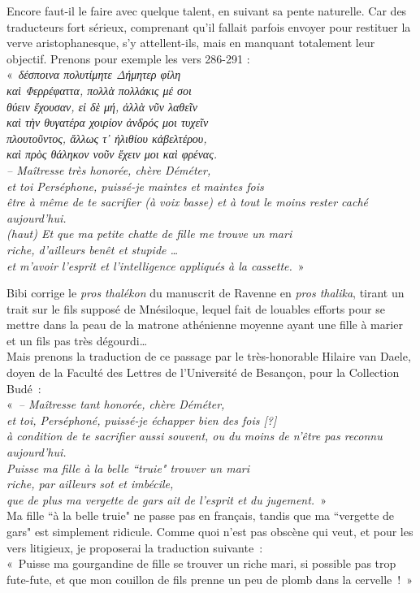 \documentclass{book}%
\newcommand{\italique}[1]{\textit{#1}}%
\begin{document}
Encore faut-il le faire avec quelque talent, en suivant sa pente naturelle. Car des traducteurs fort sérieux, comprenant qu’il fallait parfois envoyer pour restituer la verve aristophanesque, s’y attellent-ils, mais en manquant totalement leur objectif. 
Prenons pour exemple les vers 286-291 :\\
« \italique{δέσποινα πολυτίμητε Δήμητερ φίλη\\
καὶ Φερρέφαττα, πολλὰ πολλάκις μέ σοι\\
θύειν ἔχουσαν, εἰ δὲ μή, ἀλλὰ νῦν λαθεῖν\\
καὶ τὴν θυγατέρα χοιρίον ἀνδρός μοι τυχεῖν\\
πλουτοῦντος, ἄλλως τ᾽ ἠλιθίου κἀβελτέρου,\\
καὶ πρὸς θάληκον νοῦν ἔχειν μοι καὶ φρένας. \\
-- Maîtresse très honorée, chère Déméter,\\
et toi Perséphone, puissé-je maintes et maintes fois\\
être à même de te sacrifier (à voix basse) et à tout le moins rester caché aujourd’hui.\\
(haut) Et que ma petite chatte de fille me trouve un mari\\
riche, d’ailleurs benêt et stupide …\\
et m’avoir l’esprit et l’intelligence appliqués à la cassette.} »

Bibi corrige le \italique{pros thalékon} du manuscrit de Ravenne en \italique{pros thalika}, tirant un trait sur le fils supposé de Mnésiloque, lequel fait de louables efforts pour se mettre dans la peau de la matrone athénienne moyenne ayant une fille à marier et un fils pas très dégourdi… \\
Mais prenons la traduction de ce passage par le très-honorable Hilaire van Daele, doyen de la Faculté des Lettres de l’Université de Besançon, pour la Collection Budé :\\
« \italique{-- Maîtresse tant honorée, chère Déméter,\\
et toi, Perséphoné, puissé-je échapper bien des fois [?]\\
à condition de te sacrifier aussi souvent, ou du moins de n’être pas reconnu aujourd’hui.\\
Puisse ma fille à la belle ``truie" trouver un mari\\
riche, par ailleurs sot et imbécile,\\
que de plus ma vergette de gars ait de l’esprit et du jugement.} »\\
Ma fille ``à la belle truie" ne passe pas en français, tandis que ma ``vergette de gars" est simplement ridicule. Comme quoi n’est pas obscène qui veut, et pour les vers litigieux, je proposerai la traduction suivante :\\
« Puisse ma gourgandine de fille se trouver un riche mari, si possible pas trop fute-fute, et que mon couillon de fils prenne un peu de plomb dans la cervelle ! »\\
\end{document}

